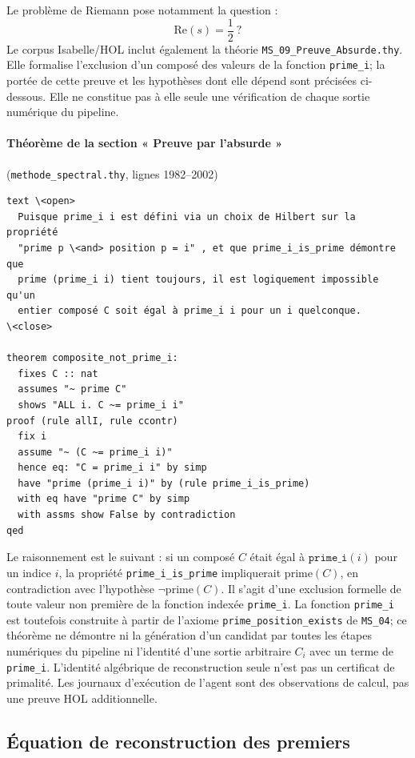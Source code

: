 \documentclass[11pt,a4paper]{article}
\begin{document}
Le problème de Riemann pose notamment la question :
\[
\mathrm{Re}(s)=\frac{1}{2}\ ?
\]
Le corpus Isabelle/HOL inclut également la théorie
\texttt{MS\_09\_Preuve\_Absurde.thy}. Elle formalise l'exclusion d'un composé
des valeurs de la fonction \texttt{prime\_i}; la portée de cette preuve et les
hypothèses dont elle dépend sont précisées ci-dessous. Elle ne constitue pas à
elle seule une vérification de chaque sortie numérique du pipeline.

\paragraph{Théorème de la section « Preuve par l'absurde »}
(\texttt{methode\_spectral.thy}, lignes 1982--2002)
\begin{Verbatim}[frame=single,fontsize=\footnotesize,framesep=3mm]
text \<open>
  Puisque prime_i i est défini via un choix de Hilbert sur la propriété
  "prime p \<and> position p = i" , et que prime_i_is_prime démontre que
  prime (prime_i i) tient toujours, il est logiquement impossible qu'un
  entier composé C soit égal à prime_i i pour un i quelconque.
\<close>

theorem composite_not_prime_i:
  fixes C :: nat
  assumes "~ prime C"
  shows "ALL i. C ~= prime_i i"
proof (rule allI, rule ccontr)
  fix i
  assume "~ (C ~= prime_i i)"
  hence eq: "C = prime_i i" by simp
  have "prime (prime_i i)" by (rule prime_i_is_prime)
  with eq have "prime C" by simp
  with assms show False by contradiction
qed
\end{Verbatim}

Le raisonnement est le suivant : si un composé $C$ était égal à
$\texttt{prime\_i}(i)$ pour un indice $i$, la propriété
\texttt{prime\_i\_is\_prime} impliquerait $\mathrm{prime}(C)$, en contradiction
avec l'hypothèse $\neg\mathrm{prime}(C)$. Il s'agit d'une exclusion formelle de
toute valeur non première de la fonction indexée \texttt{prime\_i}. La fonction
\texttt{prime\_i} est toutefois construite à partir de l'axiome
\texttt{prime\_position\_exists} de \texttt{MS\_04}; ce théorème ne démontre ni
la génération d'un candidat par toutes les étapes numériques du pipeline ni
l'identité d'une sortie arbitraire $C_i$ avec un terme de \texttt{prime\_i}.
L'identité algébrique de reconstruction seule n'est pas un certificat de
primalité. Les journaux d'exécution de l'agent sont des observations de calcul,
pas une preuve HOL additionnelle.

\subsection*{Équation de reconstruction des premiers}
\end{document}
